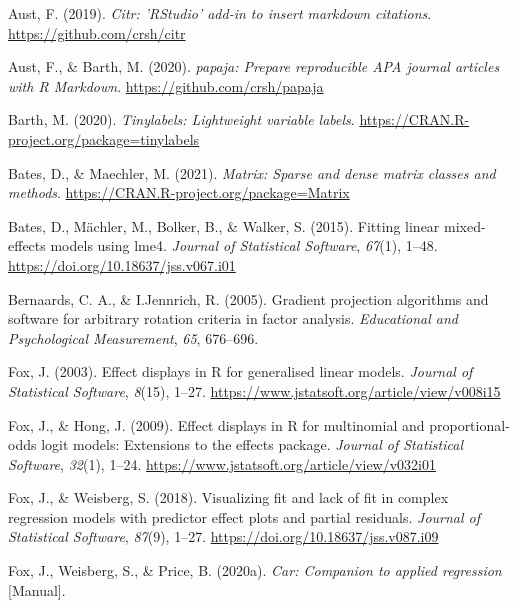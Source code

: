 \begin{appendix}
\begingroup
\setlength{\parindent}{-0.5in}
\setlength{\leftskip}{0.5in}

\hypertarget{refs}{}
\leavevmode\hypertarget{ref-R-citr}{}%
Aust, F. (2019). \emph{Citr: 'RStudio' add-in to insert markdown
citations}. \url{https://github.com/crsh/citr}

\leavevmode\hypertarget{ref-R-papaja}{}%
Aust, F., \& Barth, M. (2020). \emph{papaja: Prepare reproducible APA
journal articles with R Markdown}. \url{https://github.com/crsh/papaja}

\leavevmode\hypertarget{ref-R-tinylabels}{}%
Barth, M. (2020). \emph{Tinylabels: Lightweight variable labels}.
\url{https://CRAN.R-project.org/package=tinylabels}

\leavevmode\hypertarget{ref-R-Matrix}{}%
Bates, D., \& Maechler, M. (2021). \emph{Matrix: Sparse and dense matrix
classes and methods}. \url{https://CRAN.R-project.org/package=Matrix}

\leavevmode\hypertarget{ref-R-lme4}{}%
Bates, D., Mächler, M., Bolker, B., \& Walker, S. (2015). Fitting linear
mixed-effects models using lme4. \emph{Journal of Statistical Software},
\emph{67}(1), 1--48. \url{https://doi.org/10.18637/jss.v067.i01}

\leavevmode\hypertarget{ref-R-GPArotation}{}%
Bernaards, C. A., \& I.Jennrich, R. (2005). Gradient projection
algorithms and software for arbitrary rotation criteria in factor
analysis. \emph{Educational and Psychological Measurement}, \emph{65},
676--696.

\leavevmode\hypertarget{ref-R-effects_b}{}%
Fox, J. (2003). Effect displays in R for generalised linear models.
\emph{Journal of Statistical Software}, \emph{8}(15), 1--27.
\url{https://www.jstatsoft.org/article/view/v008i15}

\leavevmode\hypertarget{ref-R-effects_c}{}%
Fox, J., \& Hong, J. (2009). Effect displays in R for multinomial and
proportional-odds logit models: Extensions to the effects package.
\emph{Journal of Statistical Software}, \emph{32}(1), 1--24.
\url{https://www.jstatsoft.org/article/view/v032i01}

\leavevmode\hypertarget{ref-R-effects_a}{}%
Fox, J., \& Weisberg, S. (2018). Visualizing fit and lack of fit in
complex regression models with predictor effect plots and partial
residuals. \emph{Journal of Statistical Software}, \emph{87}(9), 1--27.
\url{https://doi.org/10.18637/jss.v087.i09}

\leavevmode\hypertarget{ref-R-car}{}%
Fox, J., Weisberg, S., \& Price, B. (2020a). \emph{Car: Companion to
applied regression} {[}Manual{]}.


\end{appendix}
